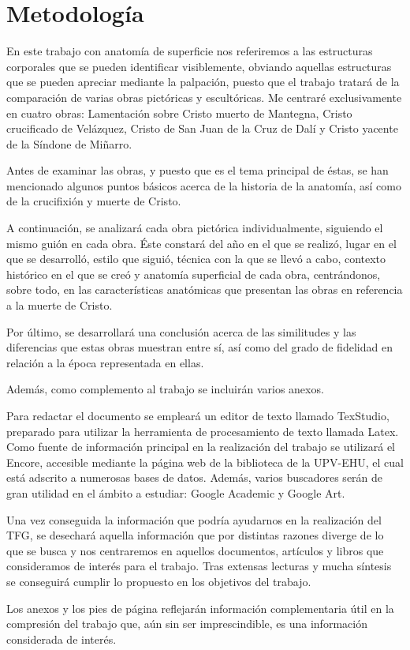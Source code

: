 \section{Metodología}
En este trabajo con anatomía de superficie nos referiremos a las estructuras corporales que se pueden identificar visiblemente, obviando aquellas estructuras que se pueden apreciar mediante la palpación, puesto que el trabajo tratará de la comparación de varias obras pictóricas y escultóricas. Me centraré exclusivamente en cuatro obras: Lamentación sobre Cristo muerto de Mantegna, Cristo crucificado de Velázquez,  %
Cristo de San Juan de la Cruz de Dalí y Cristo yacente de la Síndone de Miñarro.


Antes de examinar las obras, y puesto que es el tema principal de éstas, se han mencionado algunos puntos básicos acerca de la historia de la anatomía, así como de la crucifixión y muerte de Cristo.

A continuación, se analizará cada obra pictórica individualmente, siguiendo el mismo guión en cada obra. Éste constará del año en el que se realizó, lugar en el que se desarrolló, estilo que siguió, técnica con la que se llevó a cabo, contexto histórico en el que se creó y anatomía superficial de cada obra, centrándonos, sobre todo, en las características anatómicas que presentan las obras en referencia a la muerte de Cristo.

Por último, se desarrollará una conclusión acerca de las similitudes y las diferencias que estas obras muestran entre sí, así como del grado de fidelidad en relación a la época representada en ellas.

Además, como complemento al trabajo se incluirán varios anexos.

\vspace{12pt}

Para redactar el documento se empleará un editor de texto llamado TexStudio, preparado para utilizar la herramienta de procesamiento de texto llamada Latex. Como fuente de información principal en la realización del trabajo se utilizará el Encore, accesible mediante la página web de la biblioteca de la UPV-EHU, el cual está adscrito a numerosas bases de datos. Además, varios buscadores serán de gran utilidad en el ámbito a estudiar: Google Academic y Google Art.

Una vez conseguida la información que podría ayudarnos en la realización del TFG, se desechará aquella información que por distintas razones diverge de lo que se busca y nos centraremos en aquellos documentos, artículos y libros que consideramos de interés para el trabajo. Tras extensas lecturas y mucha síntesis se conseguirá cumplir lo propuesto en los objetivos del trabajo.

Los anexos y los pies de página reflejarán información complementaria útil en la compresión del trabajo que, aún sin ser imprescindible, es una información considerada de interés.